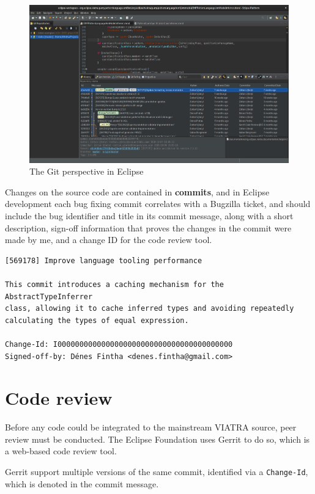 \documentclass[11pt,a4paper,oneside]{report}
\begin{document}
\begin{figure}[ht]
\centering
\includegraphics[width=150mm, keepaspectratio]{figures/eclipse-git.png}
\caption{The Git perspective in Eclipse}
\label{fig:eclipse-git}
\end{figure}

Changes on the source code are contained in \textbf{commits}, and in Eclipse
development each bug fixing commit correlates with a Bugzilla ticket, and
should include the bug identifier and title in its commit message, along with
a short description, sign-off information that proves the changes in the commit
were made by me, and a change ID for the code review tool.

\begin{lstlisting}
[569178] Improve language tooling performance

This commit introduces a caching mechanism for the AbstractTypeInferrer
class, allowing it to cache inferred types and avoiding repeatedly
calculating the types of equal expression.

Change-Id: I0000000000000000000000000000000000000000
Signed-off-by: Dénes Fintha <denes.fintha@gmail.com>
\end{lstlisting}

\section{Code review}
Before any code could be integrated to the mainstream VIATRA source, peer review
must be conducted. The Eclipse Foundation uses Gerrit to do so, which is a
web-based code review tool.

Gerrit support multiple versions of the same commit, identified via a
\texttt{Change-Id}, which is denoted in the commit message.
\end{document}
